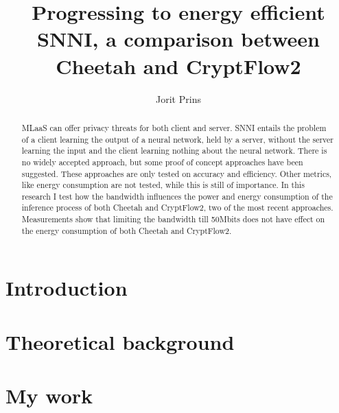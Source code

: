 \documentclass[twoside]{Style/uva-inf-bachelor-thesis}
\title{Progressing to energy efficient SNNI, a comparison between Cheetah and CryptFlow2}
\author{Jorit Prins}
\begin{document}
\maketitle

\begin{abstract}
MLaaS can offer privacy threats for both client and server. SNNI entails the problem of a client learning the output of a neural network, held by a server, without the server learning the input and the client learning nothing about the neural network. There is no widely accepted approach, but some proof of concept approaches have been suggested. These approaches are only tested on accuracy and efficiency. Other metrics, like energy consumption are not tested, while this is still of importance. In this research I test how the bandwidth influences the power and energy consumption of the inference process of both Cheetah and CryptFlow2, two of the most recent approaches. Measurements show that limiting the bandwidth till 50Mbits does not have effect on the energy consumption of both Cheetah and CryptFlow2.

\end{abstract}

\tableofcontents

\chapter{Introduction}\label{chap:introduction}


\chapter{Theoretical background}\label{chap:theoreticalbackground}


\chapter{My work}\label{chap:mywork}

\end{document}
